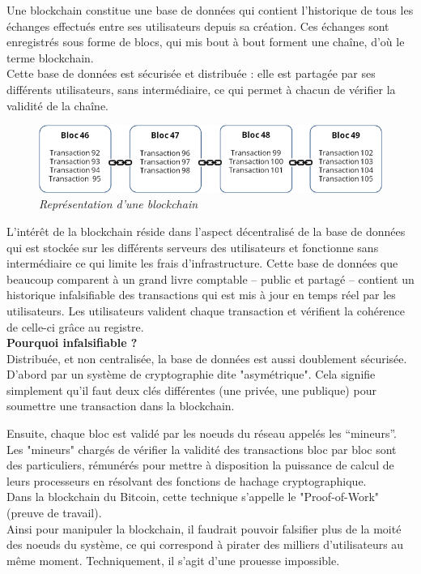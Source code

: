 \documentclass[conference]{IEEEtran}
\begin{document}
Une blockchain constitue une base de données qui contient l’historique de tous les échanges effectués entre ses utilisateurs depuis sa création. Ces échanges sont enregistrés sous forme de blocs, qui mis bout à bout forment une chaîne, d'où le terme blockchain. \\Cette base de données est sécurisée et distribuée : elle est partagée par ses différents utilisateurs, sans intermédiaire, ce qui permet à chacun de vérifier la validité de la chaîne. \cite{bcfr} 

\begin{figure}[!h]
    \centering
    \includegraphics[scale=0.55]{blck-schema.png}
    \caption{\textit{Représentation d'une blockchain \cite{bcfr}}}
    \label{fig:blockchain}
\end{figure}
\vspace{0.2cm}

L’intérêt de la blockchain réside dans l’aspect décentralisé de la base de données qui est stockée sur les différents serveurs des utilisateurs et fonctionne sans intermédiaire ce qui limite les frais d’infrastructure. Cette base de données que beaucoup comparent à un grand livre comptable – public et partagé – contient un historique infalsifiable des transactions qui est mis à jour en temps réel par les utilisateurs. Les utilisateurs valident chaque transaction et vérifient la cohérence de celle-ci grâce au registre. \\

\textbf{Pourquoi infalsifiable ? } \\
Distribuée, et non centralisée, la base de données est aussi doublement sécurisée. D'abord par un système de cryptographie dite "asymétrique". Cela signifie simplement qu'il faut deux clés différentes (une privée, une publique) pour soumettre une transaction dans la blockchain. 

Ensuite, chaque bloc est validé par les noeuds du réseau appelés les “mineurs”. Les "mineurs" chargés de vérifier la validité des transactions bloc par bloc sont des particuliers, rémunérés pour mettre à disposition la puissance de calcul de leurs processeurs en résolvant des fonctions de hachage cryptographique. \\Dans la blockchain du Bitcoin, cette technique s'appelle le "Proof-of-Work" (preuve de travail). \cite{7x7} \\
Ainsi pour manipuler la blockchain, il faudrait pouvoir falsifier plus de la moité des noeuds du système, ce qui correspond à pirater des milliers d'utilisateurs au même moment. Techniquement, il s’agit d’une prouesse impossible. \vspace{0.15cm}
\end{document}
